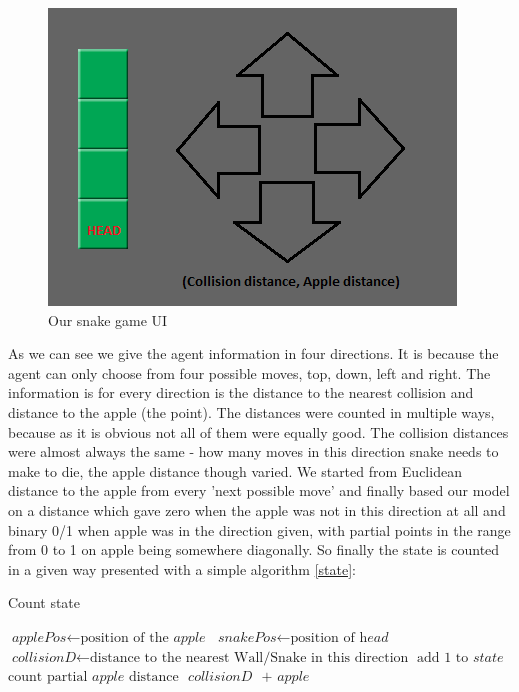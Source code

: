 \documentclass[]{article}
\begin{document}
\begin{figure}[h]
	\centering
	\includegraphics[scale=0.6]{snakeenv}
	\caption{Our snake game UI}
	\label{fig:snakeenv}
\end{figure}

\par As we can see we give the agent information in four directions. It is because the agent can only choose from four possible moves, top, down, left and right. The information is for every direction is the distance to the nearest collision and distance to the apple (the point). The distances were counted in multiple ways, because as it is obvious not all of them were equally good. The collision distances were almost always the same - how many moves in this direction snake needs to make to die, the apple distance though varied. We started from Euclidean distance to the apple from every 'next possible move' and finally based our model on a distance which gave zero when the apple was not in this direction at all and binary 0/1 when apple was in the direction given, with partial points in the range from 0 to 1 on apple being somewhere diagonally. So finally the state is counted in a given way presented with a simple algorithm \ref{state}:


\begin{algorithm}	
	\caption{Count state}\label{state}	
	\begin{algorithmic}[1]
		\State $\textit{applePos} \gets \text{position of the }\textit{apple}$
		\State $\textit{snakePos} \gets \text{position of }\textit{head}$
		\State $\textit{collisionD} \gets \text{distance to the nearest Wall/Snake in this direction}$
		\EndFor
		\State $\text{add 1 to }\textit{state}$
		\EndIf
		\EndFor
		\State $\text{count partial } \textit{apple} \text{ distance }$
		\EndIf
		\Return $\textit{collisionD }\text{ + }\textit{apple}$
		\EndProcedure
	\end{algorithmic}
\end{algorithm}
\end{document}
